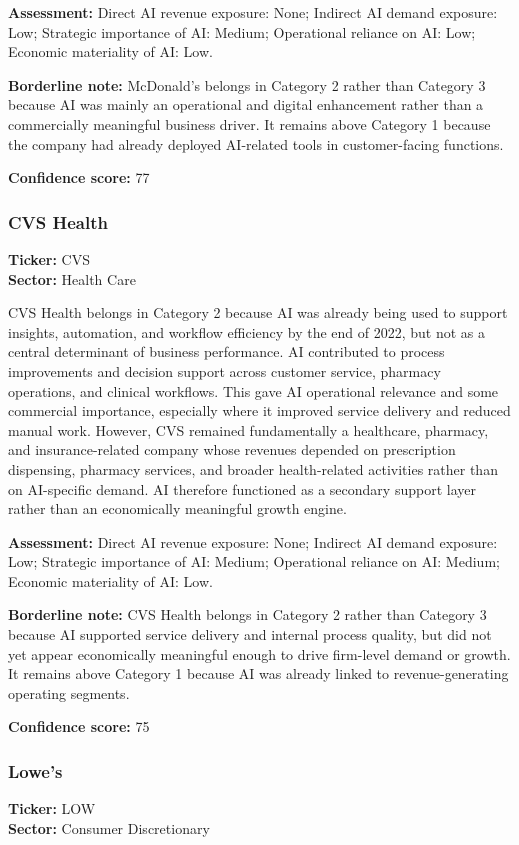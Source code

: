 \documentclass{article}
\begin{document}
\textbf{Assessment:} Direct AI revenue exposure: None; Indirect AI demand exposure: Low; Strategic importance of AI: Medium; Operational reliance on AI: Low; Economic materiality of AI: Low.

\textbf{Borderline note:} McDonald's belongs in Category 2 rather than Category 3 because AI was mainly an operational and digital enhancement rather than a commercially meaningful business driver. It remains above Category 1 because the company had already deployed AI-related tools in customer-facing functions.

\textbf{Confidence score:} 77

\subsubsection*{CVS Health}
\textbf{Ticker:} CVS \\
\textbf{Sector:} Health Care

CVS Health belongs in Category 2 because AI was already being used to support insights, automation, and workflow efficiency by the end of 2022, but not as a central determinant of business performance. AI contributed to process improvements and decision support across customer service, pharmacy operations, and clinical workflows. This gave AI operational relevance and some commercial importance, especially where it improved service delivery and reduced manual work. However, CVS remained fundamentally a healthcare, pharmacy, and insurance-related company whose revenues depended on prescription dispensing, pharmacy services, and broader health-related activities rather than on AI-specific demand. AI therefore functioned as a secondary support layer rather than an economically meaningful growth engine.

\textbf{Assessment:} Direct AI revenue exposure: None; Indirect AI demand exposure: Low; Strategic importance of AI: Medium; Operational reliance on AI: Medium; Economic materiality of AI: Low.

\textbf{Borderline note:} CVS Health belongs in Category 2 rather than Category 3 because AI supported service delivery and internal process quality, but did not yet appear economically meaningful enough to drive firm-level demand or growth. It remains above Category 1 because AI was already linked to revenue-generating operating segments.

\textbf{Confidence score:} 75

\subsubsection*{Lowe's}
\textbf{Ticker:} LOW \\
\textbf{Sector:} Consumer Discretionary
\end{document}
